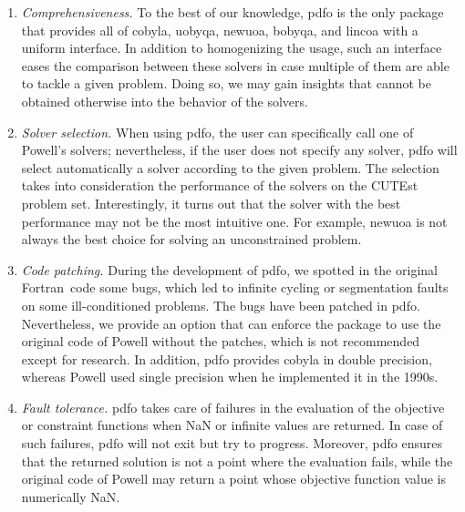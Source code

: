 \documentclass[11pt,draft]{article}
\numberwithin{equation}{section}
\def\cutest{\mbox{CUTEst}}
\def\fortran{\mbox{Fortran}}
\begin{document}
\begin{enumerate}
    \item \emph{Comprehensiveness.}
    To the best of our knowledge, \gls{pdfo} is the only package that provides all of \gls{cobyla}, \gls{uobyqa}, \gls{newuoa}, \gls{bobyqa}, and \gls{lincoa} with a uniform interface.
    In addition to homogenizing the usage, such an interface eases the comparison between these solvers in case multiple of them are able to tackle a given problem.
    Doing so, we may gain insights that cannot be obtained otherwise into the behavior of the
    solvers.%

    \item \emph{Solver selection.}
    When using \gls{pdfo}, the user can specifically call one of Powell's solvers; nevertheless, if the user does not specify any solver, \gls{pdfo} will select automatically a solver according to the given problem.
    The selection takes into consideration the performance of the solvers on the \cutest~\cite{Gould_Orban_Toint_2015} problem set.
    Interestingly, it turns out that the solver with the best performance may not be the most intuitive one.
    For example, \gls{newuoa} is not always the best choice for solving an unconstrained problem.

    \item \emph{Code patching.}
    During the development of \gls{pdfo}, we spotted in the original \fortran\ code some bugs, which led to infinite cycling or segmentation faults on some ill-conditioned problems.
    The bugs have been patched in \gls{pdfo}.
    Nevertheless, we provide an option that can enforce the package to use the original code of Powell without the patches, which is not recommended except for research.
    In addition, \gls{pdfo} provides \gls{cobyla} in double precision, whereas Powell used single precision when he implemented it in the 1990s.

    \item \emph{Fault tolerance.}
    \gls{pdfo} takes care of failures in the evaluation of the objective or constraint functions when NaN or infinite values are returned.
    In case of such failures, \gls{pdfo} will not exit but try to progress.
    Moreover, \gls{pdfo} ensures that the returned solution is not a point where the evaluation fails, while the original code of Powell may return a point whose objective function value is numerically NaN.


\end{enumerate}
\end{document}
